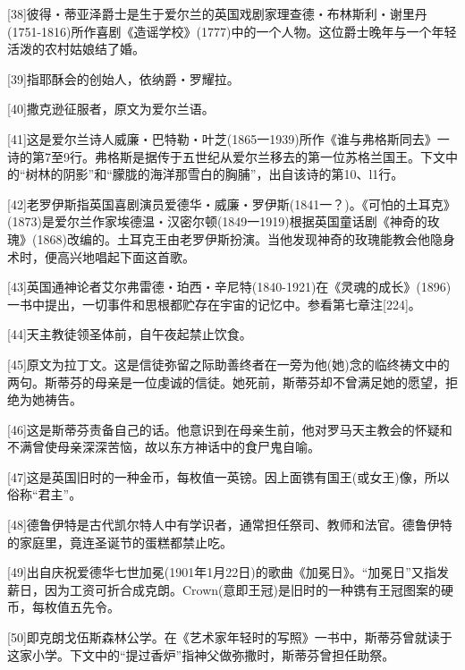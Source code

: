 \documentclass{article}
\begin{document}
[38]彼得・蒂亚泽爵士是生于爱尔兰的英国戏剧家理查德・布林斯利・谢里丹(1751-1816)所作喜剧《造谣学校》(1777)中的一个人物。这位爵士晚年与一个年轻活泼的农村姑娘结了婚。



[39]指耶酥会的创始人，依纳爵・罗耀拉。



[40]撒克逊征服者，原文为爱尔兰语。



[41]这是爱尔兰诗人威廉・巴特勒・叶芝(1865一1939)所作《谁与弗格斯同去》一诗的第7至9行。弗格斯是据传于五世纪从爱尔兰移去的第一位苏格兰国王。下文中的“树林的阴影”和“朦胧的海洋那雪白的胸脯”，出自该诗的第10、l1行。



[42]老罗伊斯指英国喜剧演员爱德华・威廉・罗伊斯(1841一？)。《可怕的土耳克》(1873)是爱尔兰作家埃德温・汉密尔顿(1849一1919)根据英国童话剧《神奇的玫瑰》(1868)改编的。土耳克王由老罗伊斯扮演。当他发现神奇的玫瑰能教会他隐身术时，便高兴地唱起下面这首歌。



[43]英国通神论者艾尔弗雷德・珀西・辛尼特(1840-1921)在《灵魂的成长》(1896)一书中提出，一切事件和思根都贮存在宇宙的记忆中。参看第七章注[224]。



[44]天主教徒领圣体前，自午夜起禁止饮食。



[45]原文为拉丁文。这是信徒弥留之际助善终者在一旁为他(她)念的临终祷文中的两句。斯蒂芬的母亲是一位虔诚的信徒。她死前，斯蒂芬却不曾满足她的愿望，拒绝为她祷告。



[46]这是斯蒂芬责备自己的话。他意识到在母亲生前，他对罗马天主教会的怀疑和不满曾使母亲深深苦恼，故以东方神话中的食尸鬼自喻。



[47]这是英国旧时的一种金币，每枚值一英镑。因上面镌有国王(或女王)像，所以俗称“君主”。



[48]德鲁伊特是古代凯尔特人中有学识者，通常担任祭司、教师和法官。德鲁伊特的家庭里，竟连圣诞节的蛋糕都禁止吃。



[49]出自庆祝爱德华七世加冕(1901年1月22日)的歌曲《加冕日》。“加冕日”又指发薪日，因为工资可折合成克朗。Crown(意即王冠)是旧时的一种镌有王冠图案的硬币，每枚值五先令。



[50]即克朗戈伍斯森林公学。在《艺术家年轻时的写照》一书中，斯蒂芬曾就读于这家小学。下文中的“提过香炉”指神父做弥撒时，斯蒂芬曾担任助祭。
\end{document}
